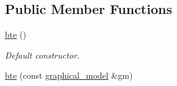\subsection*{Public Member Functions}
\begin{DoxyCompactItemize}
\item 
\hyperlink{classmerlin_1_1bte_a711d5860e89aaeab8110f915fe75921e}{bte} ()\hypertarget{classmerlin_1_1bte_a711d5860e89aaeab8110f915fe75921e}{}\label{classmerlin_1_1bte_a711d5860e89aaeab8110f915fe75921e}

\begin{DoxyCompactList}\small\item\em Default constructor. \end{DoxyCompactList}\item 
\hyperlink{classmerlin_1_1bte_aa916d19b34aa1bfccde81b14b306b5a3}{bte} (const \hyperlink{classmerlin_1_1graphical__model}{graphical\+\_\+model} \&gm)\hypertarget{classmerlin_1_1bte_aa916d19b34aa1bfccde81b14b306b5a3}{}\label{classmerlin_1_1bte_aa916d19b34aa1bfccde81b14b306b5a3}


\end{DoxyCompactItemize}
